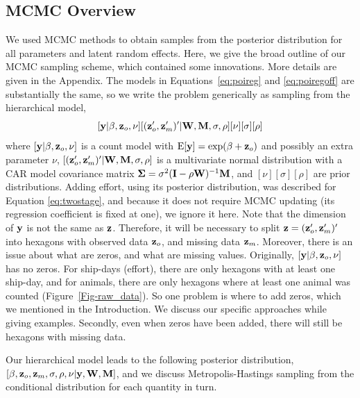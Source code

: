 \documentclass[11pt, titlepage]{article}
\begin{document}
\begin{spacing}{1.9}
\begin{flushleft}

\subsection{MCMC Overview}

We used MCMC methods to obtain samples from the posterior distribution for all parameters and latent random effects.  Here, we give the broad outline of our MCMC sampling scheme, which contained some innovations.  More details are given in the Appendix.  The models in Equations~\eqref{eq:poireg} and \eqref{eq:poiregoff} are substantially the same, so we write the problem generically as sampling from the hierarchical model,
$$
[\mathbf{y}|\beta,\mathbf{z}_{o},\nu][(\mathbf{z}_{o}^{\prime},\mathbf{z}_{m}^{\prime})^{\prime}|\mathbf{W},\mathbf{M},\sigma,\rho][\nu][\sigma][\rho]
$$
where $[\mathbf{y}|\beta,\mathbf{z}_{o},\nu]$ is a count model with $\textrm{E}[\mathbf{y}] = \exp(\beta + \mathbf{z}_{o})$ and possibly an extra parameter $\nu$, $[(\mathbf{z}_{o}^{\prime},\mathbf{z}_{m}^{\prime})^{\prime}|\mathbf{W},\mathbf{M},\sigma,\rho]$ is a multivariate normal distribution with a CAR model covariance matrix $\mbox{\boldmath $\Sigma$} = \sigma^{2}(\mathbf{I} - \rho\mathbf{W})^{-1}\mathbf{M}$, and $[\nu][\sigma][\rho]$ are prior distributions. Adding effort, using its posterior distribution, was described for Equation \eqref{eq:twostage}, and because it does not require MCMC updating (its regression coefficient is fixed at one), we ignore it here. Note that the dimension of $\mathbf{y}$ is not the same as $\mathbf{z}$.  Therefore, it will be necessary to split $\mathbf{z} = (\mathbf{z}_{o}^{\prime},\mathbf{z}_{m}^{\prime})^{\prime}$ into hexagons with observed data $\mathbf{z}_{o}$, and missing data $\mathbf{z}_{m}$.  Moreover, there is an issue about what are zeros, and what are missing values.  Originally, $[\mathbf{y}|\beta,\mathbf{z}_{o},\nu]$ has no zeros. For ship-days (effort), there are only hexagons with at least one ship-day, and for animals, there are only hexagons where at least one animal was counted (Figure~\ref{Fig-raw_data}).  So one problem is where to add zeros, which we mentioned in the Introduction.  We discuss our specific approaches while giving examples.  Secondly, even when zeros have been added, there will still be hexagons with missing data.  

Our hierarchical model leads to the following posterior distribution, $[\beta,\mathbf{z}_{o},\mathbf{z}_{m},\sigma,\rho,\nu|\mathbf{y},\mathbf{W},\mathbf{M}]$, and we discuss Metropolis-Hastings sampling from the conditional distribution for each quantity in turn.


\end{flushleft}
\end{spacing}
\end{document}
